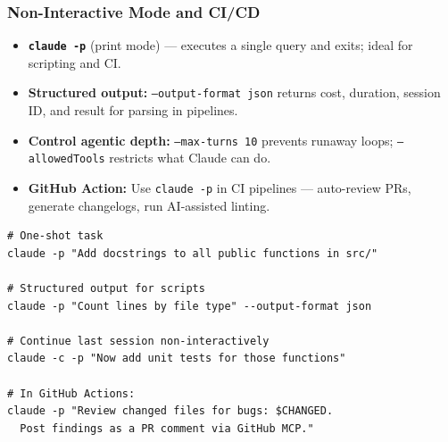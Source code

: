 \begin{frame}[fragile]\frametitle{Non-Interactive Mode and CI/CD}
  \begin{itemize}
    \item \textbf{\texttt{claude -p}} (print mode) --- executes a single query and exits; ideal for scripting and CI.
    \item \textbf{Structured output:} \texttt{--output-format json} returns cost, duration, session ID, and result for parsing in pipelines.
    \item \textbf{Control agentic depth:} \texttt{--max-turns 10} prevents runaway loops; \texttt{--allowedTools} restricts what Claude can do.
    \item \textbf{GitHub Action:} Use \texttt{claude -p} in CI pipelines --- auto-review PRs, generate changelogs, run AI-assisted linting.
  \end{itemize}

\begin{lstlisting}
# One-shot task
claude -p "Add docstrings to all public functions in src/"

# Structured output for scripts
claude -p "Count lines by file type" --output-format json

# Continue last session non-interactively
claude -c -p "Now add unit tests for those functions"

# In GitHub Actions:
claude -p "Review changed files for bugs: $CHANGED.
  Post findings as a PR comment via GitHub MCP."
\end{lstlisting}

\end{frame}

